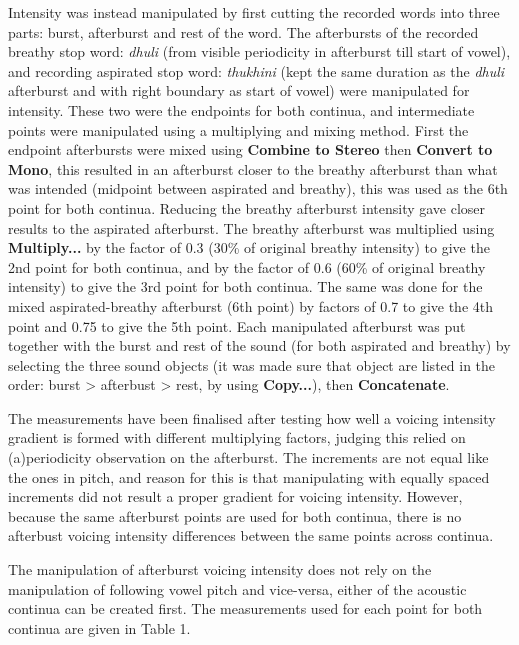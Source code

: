 \documentclass[12pt, english]{article}
\begin{document}
    Intensity was instead manipulated by first cutting the recorded words into three parts: burst, afterburst and rest of the word. The afterbursts of the recorded breathy stop word: \textit{dhuli} (from visible periodicity in afterburst till start of vowel), and recording aspirated stop word: \textit{thukhini} (kept the same duration as the \textit{dhuli} afterburst and with right boundary as start of vowel) were manipulated for intensity. These two were the endpoints for both continua, and intermediate points were manipulated using a multiplying and mixing method. First the endpoint afterbursts were mixed using \textbf{Combine to Stereo} then \textbf{Convert to Mono}, this resulted in an afterburst closer to the breathy afterburst than what was intended (midpoint between aspirated and breathy), this was used as the 6th point for both continua. Reducing the breathy afterburst intensity gave closer results to the aspirated afterburst. The breathy afterburst was multiplied using \textbf{Multiply...} by the factor of 0.3 (30\% of original breathy intensity) to give the 2nd point for both continua, and by the factor of 0.6 (60\% of original breathy intensity) to give the 3rd point for both continua. The same was done for the mixed aspirated-breathy afterburst (6th point) by factors of 0.7 to give the 4th point and 0.75 to give the 5th point. Each manipulated afterburst was put together with the burst and rest of the sound (for both aspirated and breathy) by selecting the three sound objects (it was made sure that object are listed in the order: burst > afterbust > rest, by using \textbf{Copy...}), then \textbf{Concatenate}. \\ \par
    The measurements have been finalised after testing how well a voicing intensity gradient is formed with different multiplying factors, judging this relied on (a)periodicity observation on the afterburst. The increments are not equal like the ones in pitch, and reason for this is that manipulating with equally spaced increments did not result a proper gradient for voicing intensity. However, because the same afterburst points are used for both continua, there is no afterbust voicing intensity differences between the same points across continua. \\ \par
    The manipulation of afterburst voicing intensity does not rely on the manipulation of following vowel pitch and vice-versa, either of the acoustic continua can be created first. The measurements used for each point for both continua are given in Table 1.
\end{document}
